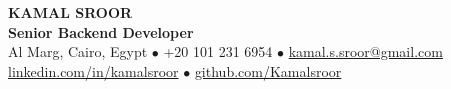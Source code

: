 \documentclass[10pt, a4paper]{article}
\begin{document}
\begin{center}
    \textbf{\Huge KAMAL SROOR} \\ \vspace{5pt}
    \textbf{\Large Senior Backend Developer} \\ \vspace{5pt}
    \small
    Al Marg, Cairo, Egypt \quad $\bullet$ \quad +20 101 231 6954 \quad $\bullet$ \quad \href{mailto:kamal.s.sroor@gmail.com}{kamal.s.sroor@gmail.com} \\ \vspace{3pt}
    \href{https://www.linkedin.com/in/kamalsroor}{linkedin.com/in/kamalsroor} \quad $\bullet$ \quad 
    \href{https://github.com/Kamalsroor}{github.com/Kamalsroor}
\end{center}

\vspace{10pt}
\end{document}
